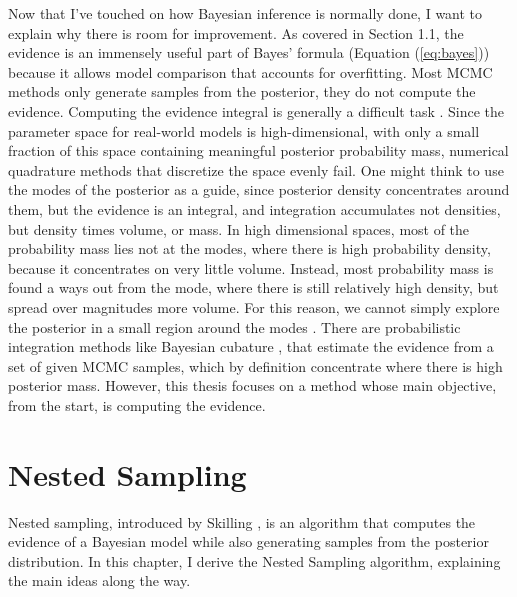\documentclass[12pt, a4paper]{report}
\begin{document}
Now that I've touched on how Bayesian inference is normally done, I want to explain why there is room for improvement.
As covered in Section 1.1, the evidence is an immensely useful part of Bayes' formula (Equation (\ref{eq:bayes})) because it allows model comparison that accounts for overfitting.
Most MCMC methods only generate samples from the posterior, they do not compute the evidence.
Computing the evidence integral is generally a difficult task \cite[221]{mcelreath}.
Since the parameter space for real-world models is high-dimensional, with only a small fraction of this space containing meaningful posterior probability mass, numerical quadrature methods that discretize the space evenly fail.
One might think to use the modes of the posterior as a guide, since posterior density concentrates around them, but the evidence is an integral, and integration accumulates not densities, but density times volume, or mass.
In high dimensional spaces, most of the probability mass lies not at the modes, where there is high probability density, because it concentrates on very little volume.
Instead, most probability mass is found a ways out from the mode, where there is still relatively high density, but spread over magnitudes more volume.
For this reason, we cannot simply explore the posterior in a small region around the modes \cite{betancourt_talk}.
There are probabilistic integration methods like Bayesian cubature \cite{bayesian_cubature}, that estimate the evidence from a set of given MCMC samples, which by definition concentrate where there is high posterior mass.
However, this thesis focuses on a method whose main objective, from the start, is computing the evidence.


\section{Nested Sampling}
Nested sampling, introduced by Skilling \cite{skilling}, is an algorithm that computes the evidence of a Bayesian model while also generating samples from the posterior distribution.
In this chapter, I derive the Nested Sampling algorithm, explaining the main ideas along the way.

\FloatBarrier %
\end{document}
